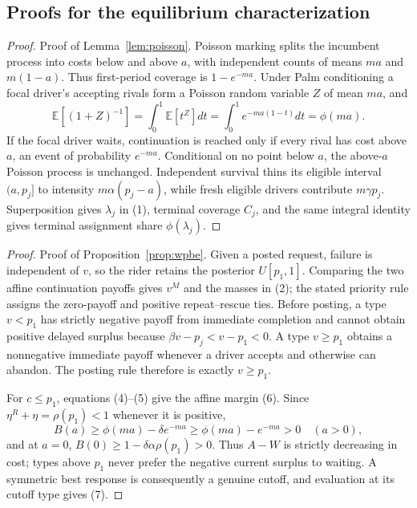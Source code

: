 \documentclass[mnsc,dblanonrev]{informs4}
\newcommand{\E}{\mathbb E}
\newcommand{\ph}{\phi}
\begin{document}
\begin{APPENDICES}
\renewcommand{\theHsection}{app.\Alph{section}}
\section{Proofs for the equilibrium characterization}
\label{app:equilibrium}

\begin{proof}{Proof of Lemma~\ref{lem:poisson}.}
Poisson marking splits the incumbent process into costs below and above $a$,
with independent counts of means $ma$ and $m(1-a)$.  Thus first-period
coverage is $1-e^{-ma}$.  Under Palm conditioning a focal driver's accepting
rivals form a Poisson random variable $Z$ of mean $ma$, and
\[
 \E\!\left[(1+Z)^{-1}\right]
 =\int_0^1\E[t^Z]dt
 =\int_0^1e^{-ma(1-t)}dt=\ph(ma).
\]
If the focal driver waits, continuation is reached only if every rival has
cost above $a$, an event of probability $e^{-ma}$.  Conditional on no point
below $a$, the above-$a$ Poisson process is unchanged.  Independent survival
thins its eligible interval $(a,p_j]$ to intensity
$m\alpha(p_j-a)$, while fresh eligible drivers contribute $m\gamma p_j$.
Superposition gives $\lambda_j$ in (1), terminal coverage $C_j$, and the
same integral identity gives terminal assignment share $\ph(\lambda_j)$.
\Halmos\end{proof}

\begin{proof}{Proof of Proposition~\ref{prop:wpbe}.}
Given a posted request, failure is independent of $v$, so the rider retains
the posterior $U[p_1,1]$.  Comparing the two affine continuation payoffs
gives $v^M$ and the masses in (2); the stated priority rule assigns the
zero-payoff and positive repeat--rescue ties.  Before posting, a type
$v<p_1$ has strictly negative payoff from immediate completion and cannot
obtain positive delayed surplus because $\beta v-p_j<v-p_1<0$.  A type
$v\ge p_1$ obtains a nonnegative immediate payoff whenever a driver accepts
and otherwise can abandon.  The posting rule therefore is exactly
$v\ge p_1$.

For $c\le p_1$, equations (4)--(5) give the affine margin (6).  Since
$\eta^R+\eta=\rho(p_1)<1$ whenever it is positive,
\[
 B(a)\ge\ph(ma)-\delta e^{-ma}
 \ge\ph(ma)-e^{-ma}>0\quad(a>0),
\]
and at $a=0$,
$B(0)\ge1-\delta\alpha\rho(p_1)>0$.  Thus $A-W$ is strictly decreasing in cost;
types above $p_1$ never prefer the negative current surplus to waiting.  A
symmetric best response is consequently a genuine cutoff, and evaluation at
its cutoff type gives (7).


\end{proof}
\end{APPENDICES}
\end{document}
